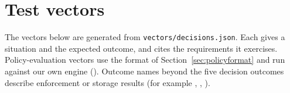 \section{Test vectors}\label{app:vectors}
The vectors below are generated from \texttt{vectors/decisions.json}. Each gives a situation and the expected outcome, and cites the requirements it exercises. Policy-evaluation vectors use the format of Section~\ref{sec:policyformat} and run against our own engine (). Outcome names beyond the five decision outcomes describe enforcement or storage results (for example , , ).

